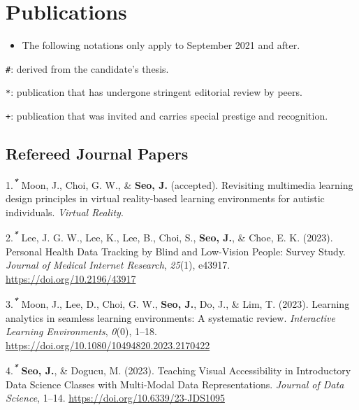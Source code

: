 \documentclass[11pt,a4paper,]{awesome-cv}
\providecommand{\tightlist}{%
	\setlength{\itemsep}{0pt}\setlength{\parskip}{0pt}}
\begin{document}
\hypertarget{publications}{%
\section{Publications}\label{publications}}

\begin{itemize}
\tightlist
\item
  The following notations only apply to September 2021 and after.
\end{itemize}

\texttt{\#}: derived from the candidate's thesis.

\texttt{*}: publication that has undergone stringent editorial review by
peers.

\texttt{+}: publication that was invited and carries special prestige
and recognition.

\hypertarget{refereed-journal-papers}{%
\subsection{Refereed Journal Papers}\label{refereed-journal-papers}}

\hypertarget{bibliography}{}
\leavevmode{}%
1.\textsuperscript{\textbf{\emph{*}}} Moon, J., Choi, G. W., \&
\textbf{Seo, J.} (accepted). Revisiting multimedia learning design
principles in virtual reality-based learning environments for autistic
individuals. \emph{Virtual Reality}.

\leavevmode{}%
2.\textsuperscript{\textbf{\emph{*}}} Lee, J. G. W., Lee, K., Lee, B.,
Choi, S., \textbf{Seo, J.}, \& Choe, E. K. (2023). Personal Health Data
Tracking by Blind and Low-Vision People: Survey Study. \emph{Journal of
Medical Internet Research}, \emph{25}(1), e43917.
\url{https://doi.org/10.2196/43917}

\leavevmode{}%
3.\textsuperscript{\textbf{\emph{*}}} Moon, J., Lee, D., Choi, G. W.,
\textbf{Seo, J.}, Do, J., \& Lim, T. (2023). Learning analytics in
seamless learning environments: A systematic review. \emph{Interactive
Learning Environments}, \emph{0}(0), 1--18.
\url{https://doi.org/10.1080/10494820.2023.2170422}

\leavevmode{}%
4.\textsuperscript{\textbf{\emph{*}}} \textbf{Seo, J.}, \& Dogucu, M.
(2023). Teaching Visual Accessibility in Introductory Data Science
Classes with Multi-Modal Data Representations. \emph{Journal of Data
Science}, 1--14. \url{https://doi.org/10.6339/23-JDS1095}
\end{document}
